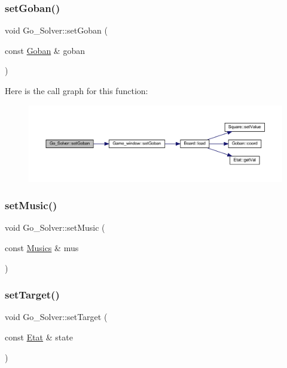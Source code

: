 \subsubsection{\texorpdfstring{set\+Goban()}{setGoban()}}
{\footnotesize\ttfamily void Go\+\_\+\+Solver\+::set\+Goban (\begin{DoxyParamCaption}\item[{const \hyperlink{class_goban}{Goban} \&}]{goban }\end{DoxyParamCaption})}

Here is the call graph for this function\+:
\nopagebreak
\begin{figure}[H]
\begin{center}
\leavevmode
\includegraphics[width=350pt]{class_go___solver_a8452c66187c526e0a6051bbb42b9bbda_cgraph}
\end{center}
\end{figure}
\mbox{\label{class_go___solver_a9b569ce8f1075a0c0136a46c62bd403a}} 
\subsubsection{\texorpdfstring{set\+Music()}{setMusic()}}
{\footnotesize\ttfamily void Go\+\_\+\+Solver\+::set\+Music (\begin{DoxyParamCaption}\item[{const \hyperlink{_globals_8h_ad531d267a0e8da4d0683298e06912177}{Musics} \&}]{mus }\end{DoxyParamCaption})}

\mbox{\label{class_go___solver_af792237fc55c0db4f5c5cc3299d51935}} 
\subsubsection{\texorpdfstring{set\+Target()}{setTarget()}\hspace{0.1cm}{\footnotesize\ttfamily [1/2]}}
{\footnotesize\ttfamily void Go\+\_\+\+Solver\+::set\+Target (\begin{DoxyParamCaption}\item[{const \hyperlink{class_etat}{Etat} \&}]{state }\end{DoxyParamCaption})}

